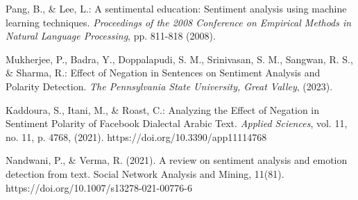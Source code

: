 \documentclass[runningheads]{llncs}
\begin{document}
\newpage
\begin{thebibliography}{8}
Pang, B., \& Lee, L.: A sentimental education: Sentiment analysis using machine learning techniques. \textit{Proceedings of the 2008 Conference on Empirical Methods in Natural Language Processing}, pp. 811-818 (2008).

Mukherjee, P., Badra, Y., Doppalapudi, S. M., Srinivasan, S. M., Sangwan, R. S., \& Sharma, R.: Effect of Negation in Sentences on Sentiment Analysis and Polarity Detection. \textit{The Pennsylvania State University, Great Valley}, (2023).

Kaddoura, S., Itani, M., \& Roast, C.: Analyzing the Effect of Negation in Sentiment Polarity of Facebook Dialectal Arabic Text. \textit{Applied Sciences}, vol. 11, no. 11, p. 4768, (2021). https://doi.org/10.3390/app11114768

Nandwani, P., \& Verma, R. (2021). A review on sentiment analysis and emotion detection from text. Social Network Analysis and Mining, 11(81). https://doi.org/10.1007/s13278-021-00776-6
\end{thebibliography}
\end{document}
